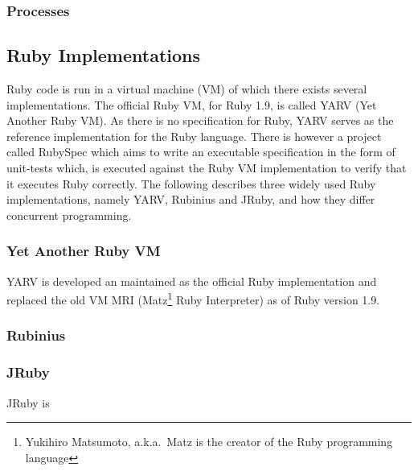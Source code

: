 \subsubsection{Processes}


\subsection{Ruby Implementations}
Ruby code is run in a virtual machine (VM) of which there exists several
implementations. The official Ruby VM, for Ruby 1.9, is called YARV (Yet 
Another Ruby VM). As there is no specification for Ruby, YARV serves as
the reference implementation for the Ruby language.  There is however a
project called RubySpec which aims to write an executable specification in the
form of unit-tests which, is executed against the Ruby VM implementation to
verify that it executes Ruby correctly. The following describes three widely
used Ruby implementations, namely YARV, Rubinius and JRuby, and how they
differ concurrent programming.

\subsubsection{Yet Another Ruby VM}
YARV is developed an maintained as the official Ruby implementation and replaced
the old VM MRI (Matz\footnote{Yukihiro Matsumoto, a.k.a.\ Matz is the creator of 
the Ruby programming language} Ruby Interpreter) as of Ruby version 1.9. 

\subsubsection{Rubinius}


\subsubsection{JRuby}
JRuby is 


